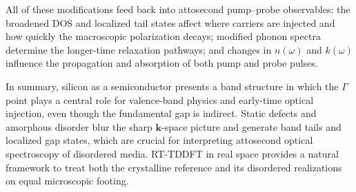 All of these modifications feed back into attosecond pump--probe observables:
the broadened DOS and localized tail states affect where carriers are injected and how quickly the macroscopic polarization decays; 
modified phonon spectra determine the longer-time relaxation pathways; 
and changes in $n(\omega)$ and $k(\omega)$ influence the propagation and absorption of both pump and probe pulses.

In summary, silicon as a semiconductor presents a band structure in which the $\Gamma$ point plays a central role for valence-band physics and early-time optical injection, even though the fundamental gap is indirect.
Static defects and amorphous disorder blur the sharp $\mathbf k$-space picture and generate band tails and localized gap states, which are crucial for interpreting attosecond optical spectroscopy of disordered media.
RT-TDDFT in real space provides a natural framework to treat both the crystalline reference and its disordered realizations on equal microscopic footing.

